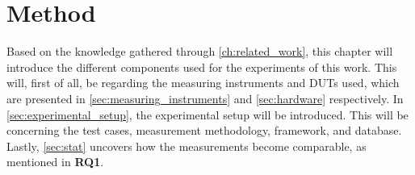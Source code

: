\chapter{Method}\label{ch:method}

Based on the knowledge gathered through \cref{ch:related_work}, this chapter will introduce the different components used for the experiments of this work. This will, first of all, be regarding the measuring instruments and DUTs used, which are presented in \cref{sec:measuring_instruments} and \cref{sec:hardware} respectively. In \cref{sec:experimental_setup}, the experimental setup will be introduced. This will be concerning the test cases, measurement methodology, framework, and database. Lastly, \cref{sec:stat} uncovers how the measurements become comparable, as mentioned in \textbf{RQ1}.







% 
% 


